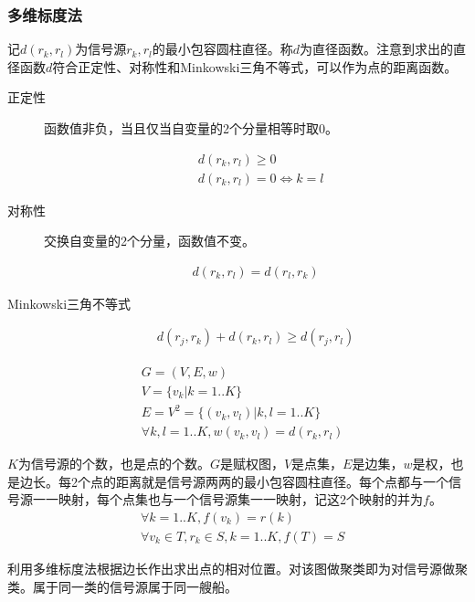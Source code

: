 \subsubsection{多维标度法}
记\(d(r_k,r_l)\)为信号源\(r_k,r_l\)的最小包容圆柱直径。称\(d\)为直径函数。注意到求出的直径函数\(d\)符合正定性、对称性和Minkowski三角不等式，可以作为点的距离函数。
\begin{description}
	\item[正定性]函数值非负，当且仅当自变量的2个分量相等时取0。\par
	\begin{align}
		&	d(r_k,r_l)\geqslant0		\\
		&	d(r_k,r_l)=0\iff k=l
	\end{align}
	\item[对称性]交换自变量的2个分量，函数值不变。\par
	\begin{align}
		d(r_k,r_l)=d(r_l,r_k)
	\end{align}
	\item[Minkowski三角不等式]\par
	\begin{align}
		d(r_j,r_k)+d(r_k,r_l)\geqslant d(r_j,r_l)
	\end{align}
\end{description}
\begin{align}
	&	G=(V,E,w)						\\
	&	V=\{v_k|k=1..K\}					\\
	&	E=V^2=\{(v_k,v_l)|k,l=1..K\}			\\
	&	\forall k,l=1..K,w(v_k,v_l)=d(r_k,r_l)
\end{align}
\par\(K\)为信号源的个数，也是点的个数。\(G\)是赋权图，\(V\)是点集，\(E\)是边集，\(w\)是权，也是边长。每2个点的距离就是信号源两两的最小包容圆柱直径。每个点都与一个信号源一一映射，每个点集也与一个信号源集一一映射，记这2个映射的并为\(f\)。
\begin{align}
	&	\forall k=1..K,f(v_k)=r(k)				\\
	&	\forall v_k\in T,r_k\in S,k=1..K,f(T)=S
\end{align}
\par 利用多维标度法根据边长作出求出点的相对位置。对该图做聚类即为对信号源做聚类。属于同一类的信号源属于同一艘船。
